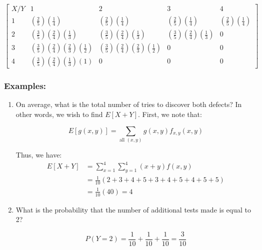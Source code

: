 \documentclass{article}
\begin{document}
\begin{equation*}
    \begin{bmatrix}
        X/Y & 1 & 2 & 3 & 4\\
        1 & \left(\frac{2}{5}\right)\left(\frac{1}{4}\right) & \left(\frac{2}{5}\right)\left(\frac{1}{4}\right) & \left(\frac{2}{5}\right)\left(\frac{1}{4}\right) & \left(\frac{2}{5}\right)\left(\frac{1}{4}\right)\\
        2 & \left(\frac{3}{5}\right)\left(\frac{2}{4}\right)\left(\frac{1}{3}\right) & \left(\frac{3}{5}\right)\left(\frac{2}{4}\right)\left(\frac{1}{3}\right) & \left(\frac{3}{5}\right)\left(\frac{2}{4}\right)\left(\frac{1}{3}\right) & 0\\
        3 & \left(\frac{3}{5}\right)\left(\frac{2}{4}\right)\left(\frac{2}{3}\right)\left(\frac{1}{2}\right) & \left(\frac{3}{5}\right)\left(\frac{2}{4}\right)\left(\frac{2}{3}\right)\left(\frac{1}{2}\right) & 0 & 0\\
        4 & \left(\frac{3}{5}\right)\left(\frac{2}{4}\right)\left(\frac{1}{3}\right)(1) & 0 & 0 & 0
    \end{bmatrix}
\end{equation*}

\subsubsection*{Examples:}
\begin{enumerate}
    \item On average, what is the total number of tries to discover both defects? In other words, we wish to find $E[X + Y]$. First, we note that:

    \begin{equation*}
        E[g(x,y)] = \sum_{\text{all }(x,y)} g(x,y)f_{x,y}(x,y)
    \end{equation*}

    Thus, we have:
    \begin{equation*}
        \begin{split}
            E[X+Y] &= \sum_{x=1}^4\sum_{y=1}^4 (x+y)f(x,y)\\
                    &= \frac{1}{10} (2 + 3 + 4 + 5 + 3 + 4 + 5 + 4 + 5 + 5)\\
                    &= \frac{1}{10} (40) = 4
        \end{split}
    \end{equation*}

    \item What is the probability that the number of additional tests made is equal to 2?

    \begin{equation*}
        P(Y=2) = \frac{1}{10} + \frac{1}{10} + \frac{1}{10} = \frac{3}{10}
    \end{equation*}
\end{enumerate}
\end{document}
